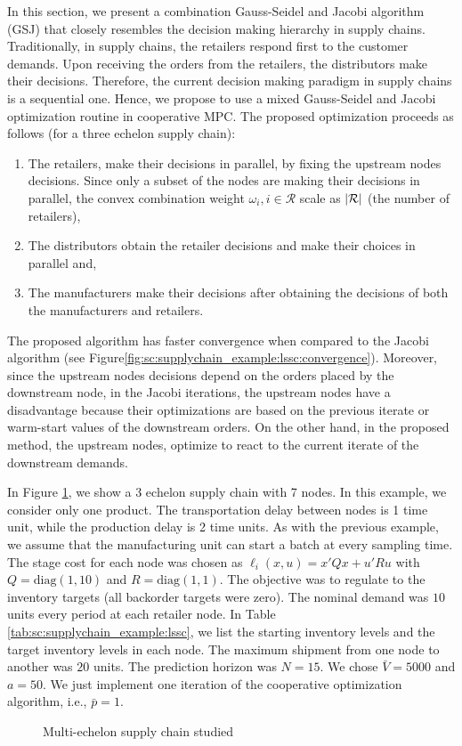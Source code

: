 In this section, we present a combination Gauss-Seidel and Jacobi
algorithm (GSJ) that closely resembles the decision making hierarchy
in supply chains. Traditionally, in supply chains, the retailers
respond first to the customer demands. Upon receiving the orders from
the retailers, the distributors make their decisions. Therefore, the
current decision making paradigm in supply chains is a sequential
one. Hence, we propose to use a mixed Gauss-Seidel and Jacobi
optimization routine in cooperative MPC. The proposed optimization
proceeds as follows (for a three echelon supply chain): 
\begin{enumerate}
\item  The retailers, make their decisions in 
parallel, by fixing the upstream nodes decisions. Since only a subset
of the nodes are making their decisions in parallel, the convex
combination weight $\omega_i, i \in \mathcal{R}$ scale as
$\vert \mathcal{R} \vert$ (the number of retailers),
\item  The distributors
obtain the retailer decisions and make their choices in parallel and,
\item  The manufacturers make their decisions after obtaining the
decisions of both the manufacturers and retailers.
\end{enumerate} 
The proposed algorithm has faster convergence when compared to the
Jacobi algorithm (see
Figure\ref{fig:sc:supplychain_example:lssc:convergence}).
Moreover, since the upstream nodes decisions
depend on the orders placed by the downstream node, in the Jacobi iterations, the upstream nodes have a disadvantage
because their optimizations are based on the previous iterate or
warm-start values of the downstream orders. On the other hand, in the
proposed method, the upstream nodes, optimize to react to the current
iterate of the downstream demands.

In Figure \ref{fig:sc:supplychain_example:lssc}, we show a 3 echelon
supply chain with 7 nodes. In this example, we consider only one
product. The transportation delay between nodes is 1 time unit,
while the production delay is 2 time units. As with the previous
example, we assume that the manufacturing unit can start a batch at
every sampling time. The stage cost for each node was chosen as
$\ell_i(x,u) = x'Qx +u'Ru$ with $Q = \text{diag}(1,10)$ and $R =
\text{diag}(1,1)$. The objective was to regulate to the inventory
targets (all backorder targets were zero). The nominal demand was $10$
units every period at each retailer node. In Table
\ref{tab:sc:supplychain_example:lssc}, we list the starting inventory
levels and the target inventory levels in each node. The maximum shipment from
one node to another was  $20$ units. The prediction horizon
was $N = 15$. We chose $\bar{V} = 5000$ and $a= 50$. We just implement
one iteration of the cooperative optimization algorithm, i.e.,
$\bar{p}=1$.
\begin{figure}[h]
\centering
\scriptsize
\resizebox{0.6\textwidth}{!}{}
\caption{Multi-echelon supply chain studied}
\label{fig:sc:supplychain_example:lssc}
\end{figure}

